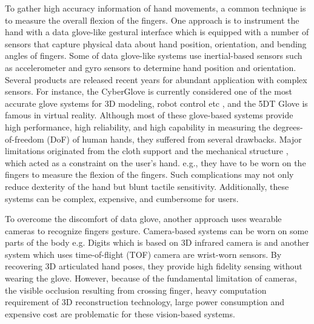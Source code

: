 \documentclass{sigchi}
\begin{document}


To gather high accuracy information of hand movements, a common technique is to measure the overall flexion of the fingers. One approach is to instrument the hand with a data glove-like gestural interface \cite{4539650} which is equipped with a number of sensors that capture physical data about hand position, orientation, and bending angles of fingers. Some of data glove-like systems use inertial-based sensors such as accelerometer and gyro sensors to determine hand position and orientation. Several products are released recent years for abundant application with complex sensors. For instance, the CyberGlove is currently considered one of the most accurate glove systems for 3D modeling, robot control etc \cite{LaViola:1999:SHP:864649} \cite{Burdea:2003:VRT:829566}, and the 5DT Glove \cite{5DT} is famous in virtual reality. 
Although most of these glove-based systems provide high performance, high reliability, and high capability in measuring the degrees-of-freedom (DoF) of human hands, they suffered from several drawbacks. %
Major limitations originated from the cloth support and the mechanical structure \cite{4539650}
, which acted as a constraint on the user’s hand. e.g., they have to be worn on the fingers to measure the flexion of the fingers. Such complications may not only reduce dexterity of the hand but blunt tactile sensitivity. Additionally, these systems can be complex, expensive, and cumbersome for users.

To overcome the discomfort of data glove, another approach uses wearable cameras to recognize fingers gesture. Camera-based systems can be worn on some parts of the body e.g. Digits \cite{Kim:2012:DFI:2380116.2380139} which is based on 3D infrared camera is and another system \cite{6855631} which uses time-of-flight (TOF) camera are wrist-worn sensors. By recovering 3D articulated hand poses, they provide high fidelity sensing without wearing the glove. However, because of the fundamental limitation of cameras, the visible occlusion resulting from crossing finger, heavy computation requirement of 3D reconstruction technology, large power consumption and expensive cost are problematic for these vision-based systems.
\end{document}
